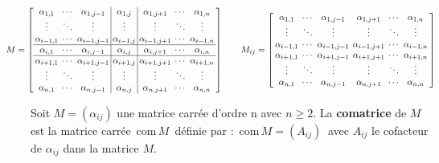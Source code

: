 \(\displaystyle \arraycolsep=0.07cm\def\arraystretch{1}  \hspace{-1cm}M= \left[
\begin{array}{ccc|c|ccc}
     \alpha_{1,1} & \cdots & \alpha_{1,j-1} & \alpha_{1,j} & \alpha_{1,j+1} & \cdots & \alpha_{1,n} \\
     \vdots & \ddots & \vdots & \vdots & \vdots & \ddots & \vdots \\
     \alpha_{i-1,1} & \cdots & \alpha_{i-1,j-1} & \alpha_{i-1,j} & \alpha_{i-1, j+1} & \cdots & \alpha_{i-1, n}\\ \hline
     \alpha_{i,1} & \cdots & \alpha_{i,j-1} & \alpha_{i,j} & \alpha_{i, j+1} & \cdots & \alpha_{i, n} \\ \hline
     \alpha_{i+1,1} & \cdots & \alpha_{i+1,j-1} & \alpha_{i+1,j} & \alpha_{i+1, j+1} & \cdots & \alpha_{i+1, n} \\ 
     \vdots & \ddots & \vdots & \vdots & \vdots & \ddots & \vdots \\
     \alpha_{n,1} & \cdots & \alpha_{n,j-1} & \alpha_{n,j} & \alpha_{n, j+1} & \cdots & \alpha_{n, n}
\end{array}
\right]
\qquad 
M_{ij}= \left[
\begin{array}{cccccc}
     \alpha_{1,1} & \cdots & \alpha_{1,j-1} &  \alpha_{1,j+1} & \cdots & \alpha_{1,n} \\
     \vdots & \ddots & \vdots &  \vdots & \ddots & \vdots \\
     \alpha_{i-1,1} & \cdots & \alpha_{i-1,j-1} & \alpha_{i-1, j+1} & \cdots & \alpha_{i-1, n}\\
     \alpha_{i+1,1} & \cdots & \alpha_{i+1,j-1} &  \alpha_{i+1, j+1} & \cdots & \alpha_{i+1, n} \\
     \vdots & \ddots & \vdots &  \vdots & \ddots & \vdots \\
     \alpha_{n,1} & \cdots & \alpha_{n,j-1} & \alpha_{n, j+1} & \cdots & \alpha_{n, n}
\end{array}
\right]
\)

\vspace{1cm}

Soit \(M=(\alpha_{ij})\) une matrice carrée d'ordre n avec \(n\geq 2\). La  \textbf{comatrice} de \(M\) est la matrice carrée\, com\(\,M\)\, définie par :\, com\(\,M=(A_{ij})\ \) avec \(A_{ij}\) le cofacteur de \(\alpha_{ij}\) dans la matrice \(M\).


\vspace{2.3cm}
